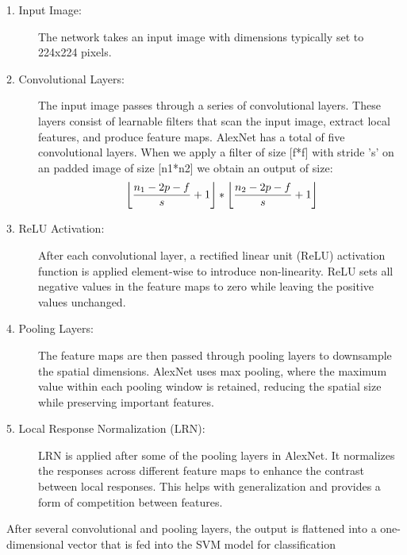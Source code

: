 \begin{description}
\item[1. Input Image:]
The network takes an input image with dimensions typically set to 224x224 pixels.
\item[2. Convolutional Layers:]
The input image passes through a series of convolutional layers. These layers consist of learnable filters that scan the input image, extract local features, and produce feature maps. AlexNet has a total of five convolutional layers.
When we apply a filter of size [f*f] with stride 's' on an padded image of size [n1*n2] we obtain an output of size:\\

\begin{equation}
\Large
\left\lfloor\frac{n_{1}-2p-f}{s}+1\right\rfloor*\left\lfloor\frac{n_{2}-2p-f}{s}+1\right\rfloor
\label{1}
\end{equation}

\item[3. ReLU Activation:]
After each convolutional layer, a rectified linear unit (ReLU) activation function is applied element-wise to introduce non-linearity. ReLU sets all negative values in the feature maps to zero while leaving the positive values unchanged.
\item[4. Pooling Layers:]
The feature maps are then passed through pooling layers to downsample the spatial dimensions. AlexNet uses max pooling, where the maximum value within each pooling window is retained, reducing the spatial size while preserving important features.
\item[5. Local Response Normalization (LRN):]
LRN is applied after some of the pooling layers in AlexNet. It normalizes the responses across different feature maps to enhance the contrast between local responses. This helps with generalization and provides a form of competition between features.
\end{description}
\par 
After several convolutional and pooling layers, the output is flattened into a one-dimensional vector that is fed into the SVM model for classification
